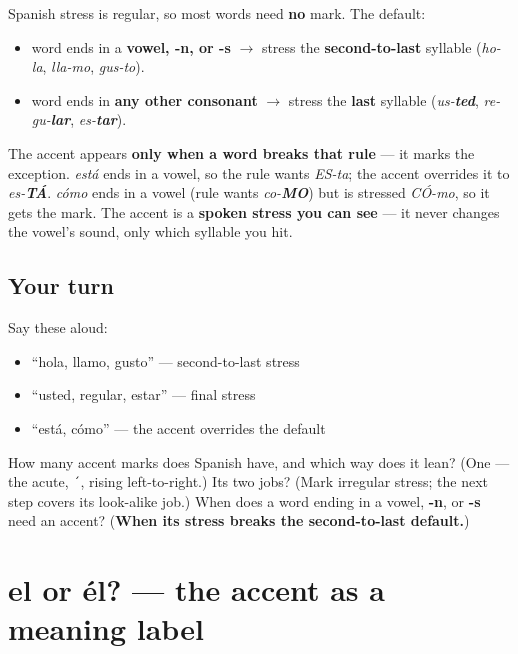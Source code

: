 \begin{grammarlens}[title={Grammar Lens: the mark records exceptional stress}]
Spanish stress is regular, so most words need \textbf{no} mark. The default:

\begin{itemize}
\raggedright
  \item word ends in a \textbf{vowel, -n, or -s} $\to$ stress the \textbf{second-to-last} syllable (\emph{ho-la}, \emph{lla-mo}, \emph{gus-to}).
  \item word ends in \textbf{any other consonant} $\to$ stress the \textbf{last} syllable (\emph{us-\textbf{ted}}, \emph{re-gu-\textbf{lar}}, \emph{es-\textbf{tar}}).
\end{itemize}

The accent appears \textbf{only when a word breaks that rule} — it marks the exception. \emph{está} ends in a vowel, so the rule wants \emph{ES-ta}; the accent overrides it to \emph{es-\textbf{TÁ}}. \emph{cómo} ends in a vowel (rule wants \emph{co-\textbf{MO}}) but is stressed \emph{CÓ-mo}, so it gets the mark. The accent is a \textbf{spoken stress you can see} — it never changes the vowel's sound, only which syllable you hit.
\end{grammarlens}

\subsection*{Your turn}
Say these aloud:

\begin{itemize}
\raggedright
  \item “hola, llamo, gusto” — second-to-last stress
  \item “usted, regular, estar” — final stress
  \item \textquotedblleft{}está, cómo\textquotedblright{} — the accent overrides the default
\end{itemize}

\begin{tcolorbox}[breakable,colback=teal!4,colframe=teal!35!black,title={Before you move on}]
How many accent marks does Spanish have, and which way does it lean? (One — the acute, \texttt{´}, rising left-to-right.) Its two jobs? (Mark irregular stress; the next step covers its look-alike job.) When does a word ending in a vowel, \textbf{-n}, or \textbf{-s} need an accent? (\textbf{When its stress breaks the second-to-last default.})
\end{tcolorbox}
\section[el / él]{el or él? — the accent as a meaning label}

